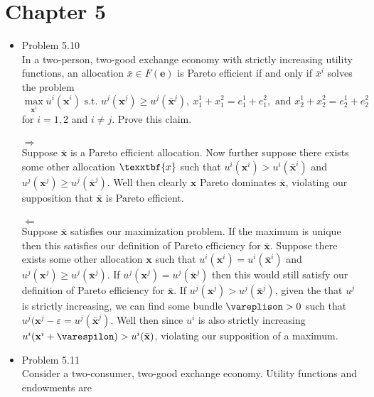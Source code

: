 \documentclass{article}
\begin{document}
\section{Chapter 5}
\begin{itemize}
    \item Problem 5.10\\
    In a two-person, two-good exchange economy with strictly increasing utility functions, an allocation $\bar{x}\in F(\textbf{e})$ is Pareto efficient if and only if $\bar{x}^i$ solves the problem
    \begin{equation*}
        \max_{\mathbf{x}^{i}}u^{i}(\mathbf{x}^{i})\text{ s.t. }u^{j}(\mathbf{x}^{j})\geq u^{j}(\overline{\mathbf{x}}^{j}),~x_{1}^{1}+x_{1}^{2}= e_{1}^{1}+e_{1}^{2},\text{ and }x_{2}^{1}+x_{2}^{2}= e_{2}^{1}+e_{2}^{2}
    \end{equation*}
    for $i=1,2$ and $i\neq j$.  Prove this claim.\\\\
    $\Rightarrow$\\
    Suppose $\bar{\textbf{x}}$ is a Pareto efficient allocation.  Now further suppose there exists some other allocation $\texxtbf{x}$ such that $u^i(\textbf{x}^i)>u^i(\bar{\textbf{x}}^i)$ and $u^j(\textbf{x}^j)\geq u^j(\bar{\textbf{x}}^j)$.  Well then clearly $\textbf{x}$ Pareto dominates $\bar{\textbf{x}}$, violating our supposition that $\bar{\textbf{x}}$ is Pareto efficient.\\\\
    $\Leftarrow$\\
    Suppose $\bar{\textbf{x}}$ satisfies our maximization problem.  If the maximum is unique then this satisfies our definition of Pareto efficiency for $\bar{\textbf{x}}$. Suppose there exists some other allocation $\textbf{x}$ such that $u^i(\textbf{x}^i)=u^i(\bar{\textbf{x}}^i)$ and $u^j(\textbf{x}^j)\geq u^j(\bar{\textbf{x}}^j)$.  If $u^j(\textbf{x}^j)=u^j(\bar{\textbf{x}}^j)$ then this would still satisfy our definition of Pareto efficiency for $\bar{\textbf{x}}$.  If $u^j(\textbf{x}^j)>u^j(\bar{\textbf{x}}^j)$, given the that $u^j$ is strictly increasing, we can find some bundle $\vareplison>0$ such that $u^j(\textbf{x}^j-\varepsilon=u^j(\bar{\textbf{x}}^j)$.  Well then since $u^i$ is also strictly increasing $u^i(\textbf{x}^i+\varespilon)>u^i(\bar{\textbf{x}})$, violating our supposition of a maximum.
    \pagebreak
    \item Problem 5.11\\
    Consider a two-consumer, two-good exchange economy.  Utility functions and endowments are

\end{itemize}
\end{document}
